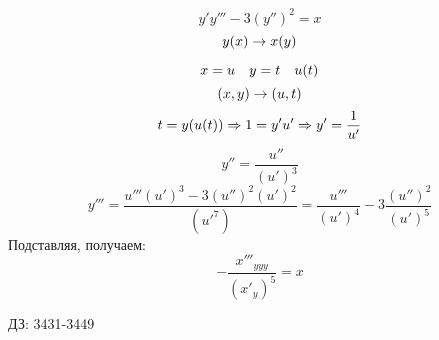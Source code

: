 \documentclass[main]{subfiles}
\begin{document}
    \begin{Example}
        \[y' y''' - 3(y'')^2 = x\]
        \[y(x) \rightarrow x(y)\]
    \end{Example}

    \begin{Sol}
        \[x = u \quad y = t \quad u(t)\]
        \[(x,y) \rightarrow (u,t)\]
        \[t = y(u(t)) \Rightarrow 1 = y' u' \Rightarrow y' = \dfrac{1}{u'}\]
        \[y'' = \dfrac{u''}{(u')^3}\]
        \[y''' = \dfrac{u''' (u')^3 - 3 (u'')^2 (u')^2}{(u'^7)} = \dfrac{u'''}{(u')^4} - 3 \dfrac{(u'')^2}{(u')^5}\]
        Подставляя, получаем:
        \[-\dfrac{x'''_{yyy}}{(x'_y)^5} = x\]
    \end{Sol}

    ДЗ: 3431-3449
\end{document}
